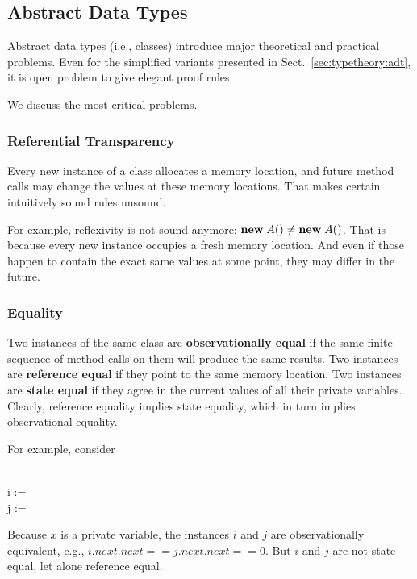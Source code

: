 \subsection{Abstract Data Types}

Abstract data types (i.e., classes) introduce major theoretical and practical problems.
Even for the simplified variants presented in Sect.~\ref{sec:typetheory:adt}, it is open problem to give elegant proof rules.

We discuss the most critical problems.

\subsubsection{Referential Transparency}

Every new instance of a class allocates a memory location, and future method calls may change the values at these memory locations.
That makes certain intuitively sound rules unsound.

For example, reflexivity is not sound anymore: ${\rm \bf new}\; A()\neq {\rm \bf new}\; A()$.
That is because every new instance occupies a fresh memory location.
And even if those happen to contain the exact same values at some point, they may differ in the future.

\subsubsection{Equality}

Two instances of the same class are \textbf{observationally equal} if the same finite sequence of method calls on them will produce the same results.
Two instances are \textbf{reference equal} if they point to the same memory location.
Two instances are \textbf{state equal} if they agree in the current values of all their private variables.
Clearly, reference equality implies state equality, which in turn implies observational equality.

For example, consider
\begin{acode}
\\
i := \\
j := 
\end{acode}
Because $x$ is a private variable, the instances $i$ and $j$ are observationally equivalent, e.g., $i.next.next == j.next.next == 0$.
But $i$ and $j$ are not state equal, let alone reference equal.

